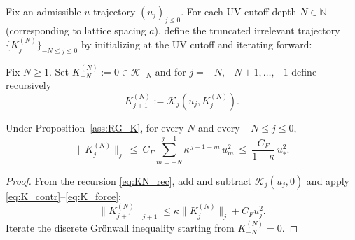 Fix an admissible $u$-trajectory $(u_j)_{j\le 0}$.
For each UV cutoff depth $N\in\mathbb N$ (corresponding to lattice spacing $a$), define the truncated irrelevant trajectory
$\{K^{(N)}_j\}_{-N\le j\le 0}$ by initializing at the UV cutoff and iterating forward:

\begin{definition}\label{def:KN}
Fix $N\ge 1$. Set $K^{(N)}_{-N}:=0\in \mathscr K_{-N}$ and for $j=-N,-N+1,\dots,-1$ define recursively
\begin{equation}\label{eq:KN_rec}
K^{(N)}_{j+1}:=\mathcal K_j(u_j,K^{(N)}_j).
\end{equation}
\end{definition}

\begin{lemma}\label{lem:K_bound}
Under Proposition~\ref{ass:RG_K}, for every $N$ and every $-N\le j\le 0$,
\begin{equation}\label{eq:K_forcing_bound}
\|K^{(N)}_j\|_{j}\ \le\ C_F\sum_{m=-N}^{j-1} \kappa^{\,j-1-m}\,u_m^2
\ \le\ \frac{C_F}{1-\kappa}\,u_\ast^2.
\end{equation}
\end{lemma}

\begin{proof}
From the recursion \eqref{eq:KN_rec}, add and subtract $\mathcal K_j(u_j,0)$ and apply \eqref{eq:K_contr}--\eqref{eq:K_force}:
\[
\|K^{(N)}_{j+1}\|_{j+1}\le \kappa \|K^{(N)}_j\|_{j}+ C_F u_j^2.
\]
Iterate the discrete Gr\"onwall inequality starting from $K^{(N)}_{-N}=0$.
\end{proof}

